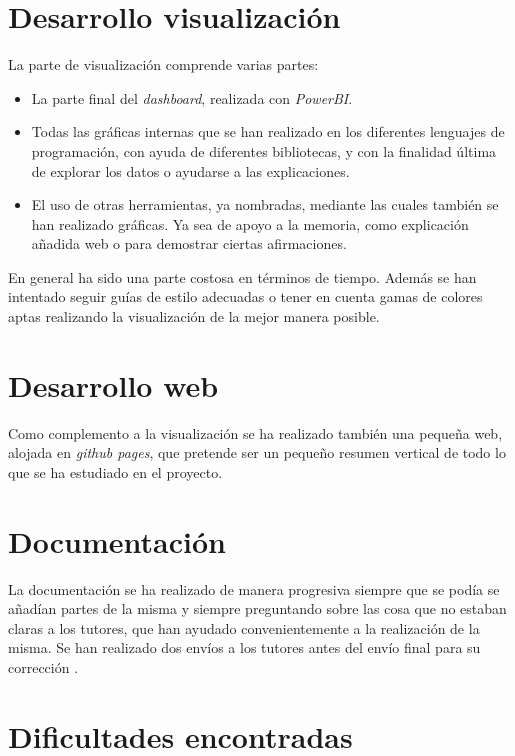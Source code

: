 \section{Desarrollo visualización}\label{grafico}
La parte de visualización comprende varias partes:

\begin{itemize}
	\item La parte final del \textit{dashboard}, realizada con \textit{PowerBI}.
	\item Todas las gráficas internas que se han realizado en los diferentes lenguajes de programación, con ayuda de diferentes bibliotecas, y con la finalidad última de explorar los datos o ayudarse a las explicaciones.
	\item El uso de otras herramientas, ya nombradas, mediante las cuales también se han realizado gráficas. Ya sea de apoyo a la memoria, como explicación añadida web o para demostrar ciertas afirmaciones.
\end{itemize}

En general ha sido una parte costosa en términos de tiempo. Además se han intentado seguir guías de estilo \cite{visualisation_2016} adecuadas o tener en cuenta gamas de colores aptas realizando la visualización de la mejor manera posible. 

\section{Desarrollo web}\label{dweb}

Como complemento a la visualización se ha realizado también una pequeña web, alojada en \textit{github pages}, que pretende ser un pequeño resumen vertical de todo lo que se ha estudiado en el proyecto.

\section{Documentación}\label{docs}

La documentación se ha realizado de manera progresiva siempre que se podía se añadían partes de la misma y siempre preguntando sobre las cosa que no estaban claras a los tutores, que han ayudado convenientemente a la realización de la misma. Se han realizado dos envíos a los tutores antes del envío final para su corrección .

\section{Dificultades encontradas}\label{inicio-proyecto}


